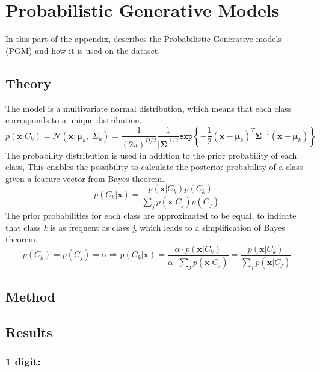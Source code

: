 \chapter{Probabilistic Generative Models}
In this part of the appendix, describes the Probabilistic Generative models (PGM) and how it is used on the dataset.

\section{Theory} 
The model is a multivariate normal distribution, which means that each class corresponds to a unique distribution.
\begin{equation}
p(\mathbf{x}|C_k)=
\mathcal{N}(\mathbf{x};\mathbf{\mu}_k, \; \Sigma_k) =
 \dfrac{1}{(2\pi)^{D/2}} \dfrac{1}{\left|\mathbf{\Sigma} \right|^{1/2}} \mathtt{exp} \left\lbrace -\dfrac{1}{2} (\mathbf{x}-\mathbf{\mu}_k)^T \mathbf{\Sigma}^{-1} (\mathbf{x}-\mathbf{\mu}_k) \right\rbrace
\label{eq:gauss_dist} 
\end{equation}
The probability distribution is used in addition to the prior probability of each class, This enables the possibility to calculate the posterior probability of a class given a feature vector from Bayes theorem.
\begin{equation}
p(C_k |\mathbf{x}) = \dfrac{p(\mathbf{x}|C_k) p(C_k)}{\sum_j p(\mathbf{x}|C_j) p(C_j)}
\label{eq:posteriorP}
\end{equation}
The prior probabilities for each class are approximated to be equal, to indicate that class \textit{k} is as frequent as class \textit{j}, which leads to a simplification of Bayes theorem.
\begin{equation}
p(C_k) = p(C_j) = \alpha \Longrightarrow p(C_k |\mathbf{x}) = 
\dfrac
{\alpha \cdot p(\mathbf{x}|C_k) }
{\alpha \cdot \sum_j p(\mathbf{x}|C_j) } = 
\dfrac{p(\mathbf{x}|C_k)}
{\sum_j p(\mathbf{x}|C_j)}
\label{eq:posteriorPsimple}
\end{equation}

\section{Method}

\section{Results}

\subsection{1 digit:}

